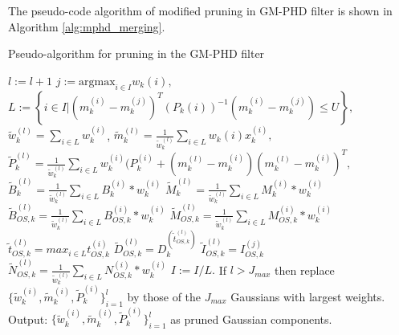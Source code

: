 The pseudo-code algorithm of modified pruning in GM-PHD filter is shown in Algorithm \ref{alg:mphd_merging}.
\begin{algorithm}
  \caption{Pseudo-algorithm for pruning in the GM-PHD filter}
  \begin{algorithmic}[1]
        \State $l:= l+1$
        \State $j:= \text{argmax}_{i \in I} w_k{(i)},$
        \State $L:= \left\{ i \in I | (m_k^{(i)} - m_k^{(j)})^T (P_k{(i)})^{-1} (m_k^{(i)} - m_k^{(j)}) \leq U \right\},$
        \State $\tilde{w}_k^{(l)} = \sum_{i \in L} w_k^{(i)}$,
        \State $\tilde{m}_k^{(l)} = \frac{1}{\tilde{w}_k^{(l)}} \sum_{i \in L} w_k{(i)} x_k^{(i)},$
        \State $\tilde{P}_k^{(l)} = \frac{1}{\tilde{w}_k^{(l)}} \sum_{i \in L} w_k^{(i)} (P_k^{(i)} + (m_k^{(l)} - m _k^{(i)}) (m_k^{(l)} - m _k^{(i)})^T,$
        \State $\tilde{B}_k^{(l)} = \frac{1}{\tilde{w}_k^{(l)}} \sum_{i \in L} B_k^{(i)} * w_k^{(i)}$
        \State $\tilde{M}_k^{(l)} = \frac{1}{\tilde{w}_k^{(l)}} \sum_{i \in L} M_k^{(i)} * w_k^{(i)}$
        \State $\tilde{B}_{OS,k}^{(l)} = \frac{1}{\tilde{w}_k^{(l)}} \sum_{i \in L} B_{OS,k}^{(i)} * w_k^{(i)}$ 
        \State $\tilde{M}_{OS,k}^{(l)} = \frac{1}{\tilde{w}_k^{(l)}} \sum_{i \in L} M_{OS,k}^{(i)} * w_k^{(i)}$
        \State $\tilde{t}_{OS,k}^{(l)} = max_{i \in L} t_{OS,k}^{(i)}$
        \State $\tilde{D}_{OS,k}^{(l)} = D_k^{(\tilde{t}_{OS,k}^{(l)})}$
        \State $\tilde{I}_{OS,k}^{(l)} = {I}_{OS,k}^{(j)}$ 
        \State $\tilde{N}_{OS,k}^{(l)} = \frac{1}{\tilde{w}_k^{(l)}} \sum_{i \in L} N_{OS,k}^{(i)} * w_k^{(i)}$
        \State $I:= I/L.$
      \EndWhile
    \EndProcedure
    \State
    \State If $l > J_{max}$ then replace $\{ \tilde{w}_k^{(i)}, \tilde{m}_k^{(i)}, \tilde{P}_k^{(i)} \}_{i=1}^l$
    by those of the $J_{max}$ Gaussians with largest weights.
    \State
    \State Output: $\{ \tilde{w}_k^{(i)}, \tilde{m}_k^{(i)}, \tilde{P}_k^{(i)} \}_{i=1}^l$ as pruned Gaussian components.

  \end{algorithmic}
  \label{alg:mphd_merging}
\end{algorithm}
